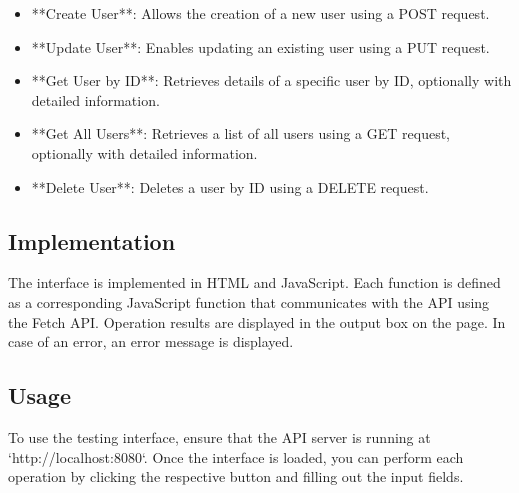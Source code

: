 \documentclass[12pt]{article}
\begin{document}
	\begin{itemize}
		\item **Create User**: Allows the creation of a new user using a POST request.
		\item **Update User**: Enables updating an existing user using a PUT request.
		\item **Get User by ID**: Retrieves details of a specific user by ID, optionally with detailed information.
		\item **Get All Users**: Retrieves a list of all users using a GET request, optionally with detailed information.
		\item **Delete User**: Deletes a user by ID using a DELETE request.
	\end{itemize}

	\subsection{Implementation}

	The interface is implemented in HTML and JavaScript. Each function is defined as a corresponding JavaScript function that communicates with the API using the Fetch API. Operation results are displayed in the output box on the page. In case of an error, an error message is displayed.

	\subsection{Usage}

	To use the testing interface, ensure that the API server is running at `http://localhost:8080`. Once the interface is loaded, you can perform each operation by clicking the respective button and filling out the input fields.
\end{document}
